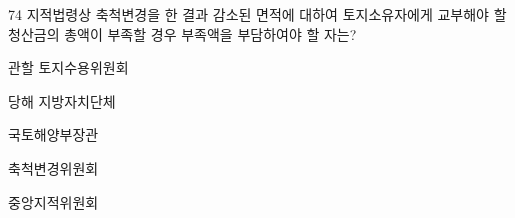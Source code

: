 \begin{question}{74}
지적법령상 축척변경을 한 결과 감소된 면적에 대하여 토지소유자에게 교부해야 할 청산금의 총액이 부족할 경우 부족액을 부담하여야 할 자는?
\begin{choices}
  \item 관할 토지수용위원회
  \item 당해 지방자치단체
  \item 국토해양부장관
  \item 축척변경위원회
  \item 중앙지적위원회
\end{choices}
\end{question}

